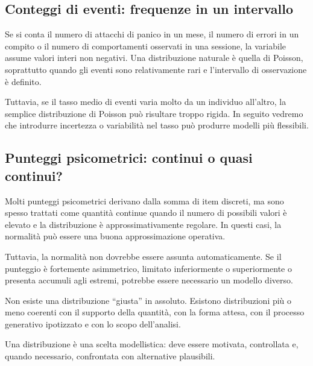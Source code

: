 \documentclass[
  italian,
  letterpaper,
  a4paper,
  11pt,
  open=any]{scrbook}
\theoremstyle{plain}
\theoremstyle{definition}
\theoremstyle{definition}
\theoremstyle{remark}
\begin{document}
\subsection{Conteggi di eventi: frequenze in un
intervallo}\label{conteggi-di-eventi-frequenze-in-un-intervallo}

Se si conta il numero di attacchi di panico in un mese, il numero di
errori in un compito o il numero di comportamenti osservati in una
sessione, la variabile assume valori interi non negativi. Una
distribuzione naturale è quella di Poisson, soprattutto quando gli
eventi sono relativamente rari e l'intervallo di osservazione è
definito.

Tuttavia, se il tasso medio di eventi varia molto da un individuo
all'altro, la semplice distribuzione di Poisson può risultare troppo
rigida. In seguito vedremo che introdurre incertezza o variabilità nel
tasso può produrre modelli più flessibili.

\subsection{Punteggi psicometrici: continui o quasi
continui?}\label{punteggi-psicometrici-continui-o-quasi-continui}

Molti punteggi psicometrici derivano dalla somma di item discreti, ma
sono spesso trattati come quantità continue quando il numero di
possibili valori è elevato e la distribuzione è approssimativamente
regolare. In questi casi, la normalità può essere una buona
approssimazione operativa.

Tuttavia, la normalità non dovrebbe essere assunta automaticamente. Se
il punteggio è fortemente asimmetrico, limitato inferiormente o
superiormente o presenta accumuli agli estremi, potrebbe essere
necessario un modello diverso.

\begin{tcolorbox}[enhanced jigsaw, arc=.35mm, bottomrule=.15mm, bottomtitle=1mm, breakable, colback=white, colbacktitle=quarto-callout-warning-color!10!white, colframe=quarto-callout-warning-color-frame, coltitle=black, left=2mm, leftrule=.75mm, opacityback=0, opacitybacktitle=0.6, rightrule=.15mm, title=\textcolor{quarto-callout-warning-color}{\faExclamationTriangle}\hspace{0.5em}{Un errore comune}, titlerule=0mm, toprule=.15mm, toptitle=1mm]

Non esiste una distribuzione ``giusta'' in assoluto. Esistono
distribuzioni più o meno coerenti con il supporto della quantità, con la
forma attesa, con il processo generativo ipotizzato e con lo scopo
dell'analisi.

Una distribuzione è una scelta modellistica: deve essere motivata,
controllata e, quando necessario, confrontata con alternative
plausibili.

\end{tcolorbox}
\end{document}
